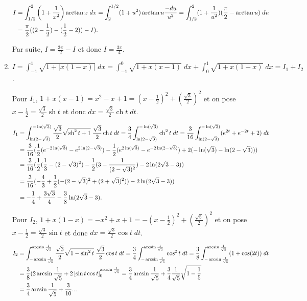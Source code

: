 \documentclass[11pt,a4paper]{article}
\newcommand{\ch}{\mathop{\mathrm{ch}}\nolimits}
\newcommand{\sh}{\mathop{\mathrm{sh}}\nolimits}
\newcommand{\Arcsin}{\mathop{\mathrm{arcsin}}\nolimits}
\newcommand{\Arctan}{\mathop{\mathrm{arctan}}\nolimits}
\begin{document}
\begin{enumerate}
\begin{align*}\ensuremath
I&=\int_{1/2}^{2}\left(1+\frac{1}{x^2}\right)\Arctan x\;dx=\int_{2}^{1/2}(1+u^2)\Arctan u\frac{-du}{u^2}=\int_{1/2}^{2}(1+\frac{1}{u^2})(\frac{\pi}{2}-\Arctan u)\;du\\
 &=\frac{\pi}{2}((2-\frac{1}{2})-(\frac{1}{2}-2))-I).
\end{align*}

Par suite, $I=\frac{3\pi}{2}-I$ et donc $I=\frac{3\pi}{4}$.

\item  $I=\int_{-1}^{1}\sqrt{1+|x(1-x)|}\;dx=\int_{-1}^{0}\sqrt{1+x(x-1)}\;dx+\int_{0}^{1}\sqrt{1+x(1-x)}\;dx=I_1+I_2$.

Pour $I_1$, $1+x(x-1)=x^2-x+1=(x-\frac{1}{2})^2+(\frac{\sqrt{3}}{2})^2$ et on pose $x-\frac{1}{2}=\frac{\sqrt{3}}{2}\sh t$ et donc $dx=\frac{\sqrt{3}}{2}\ch t\;dt$.

\begin{align*}\ensuremath
I_1&=\int_{\ln(2-\sqrt{3})}^{-\ln(\sqrt{3})}\frac{\sqrt{3}}{2}\sqrt{\sh^2t+1}\;\frac{\sqrt{3}}{2}\ch t\;dt=
\frac{3}{4}\int_{\ln(2-\sqrt{3})}^{-\ln(\sqrt{3})}\ch^2t\;dt=\frac{3}{16}\int_{\ln(2-\sqrt{3})}^{-\ln(\sqrt{3})}(e^{2t}+e^{-2t}+2)\;dt\\
 &=\frac{3}{16}(\frac{1}{2}(e^{-2\ln(\sqrt{3})}-e^{2\ln(2-\sqrt{3})})-\frac{1}{2}(e^{2\ln(\sqrt{3})}-e^{-2\ln(2-\sqrt{3})})+2(-\ln(\sqrt{3})-\ln(2-\sqrt{3})))\\
 &=\frac{3}{16}(\frac{1}{2}(\frac{1}{3}-(2-\sqrt{3})^2)-\frac{1}{2}(3-\frac{1}{(2-\sqrt{3})^2})-2\ln(2\sqrt{3}-3))\\
 &=\frac{3}{16}(-\frac{4}{3}+\frac{1}{2}(-(2-\sqrt{3})^2+(2+\sqrt{3})^2))-2\ln(2\sqrt{3}-3))\\
 &=-\frac{1}{4}+\frac{3\sqrt{3}}{4}-\frac{3}{8}\ln(2\sqrt{3}-3).
\end{align*}

Pour $I_2$, $1+x(1-x)=-x^2+x+1=-(x-\frac{1}{2})^2+(\frac{\sqrt{5}}{2})^2$ et on pose $x-\frac{1}{2}=\frac{\sqrt{3}}{2}\sin t$ et donc $dx=\frac{\sqrt{3}}{2}\cos t\;dt$.

\begin{align*}\ensuremath
I_2&=\int_{-\Arcsin\frac{1}{\sqrt{5}}}^{\Arcsin\frac{1}{\sqrt{5}}}\frac{\sqrt{3}}{2}\sqrt{1-\sin^2t}\;\frac{\sqrt{3}}{2}\cos t\;dt=
\frac{3}{4}\int_{-\Arcsin\frac{1}{\sqrt{5}}}^{\Arcsin\frac{1}{\sqrt{5}}}\cos^2t\;dt
=\frac{3}{8}\int_{-\Arcsin\frac{1}{\sqrt{5}}}^{\Arcsin\frac{1}{\sqrt{5}}}(1+\cos(2t))\;dt\\
 &=\frac{3}{8}(2\Arcsin\frac{1}{\sqrt{5}}+2\left[\sin t\cos t\right]_{0}^{\Arcsin\frac{1}{\sqrt{5}}}
 =\frac{3}{4}\Arcsin\frac{1}{\sqrt{5}}+\frac{3}{4}\frac{1}{\sqrt{5}}\sqrt{1-\frac{1}{5}}\\
 &=\frac{3}{4}\Arcsin\frac{1}{\sqrt{5}}+\frac{3}{10}...
\end{align*}


\end{enumerate}
\end{document}

